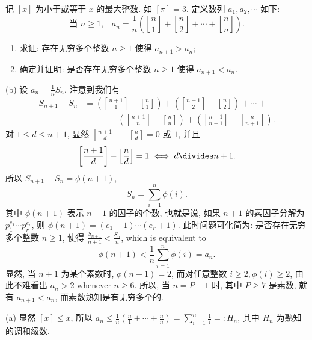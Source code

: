 \begin{prob}
\label{prob:prob-7}
记 $[x]$ 为小于或等于 $x$ 的最大整数. 如 $[\pi] = 3$.
定义数列 $a_1,a_2,\cdots$ 如下:
\[
\text{当 $n \ge 1$,}\quad a_n =
\frac{1}{n}\left(\left[\frac{n}{1}\right] +\left[\frac{n}{2}\right]
+ \cdots + \left[\frac{n}{n}\right]\right).
\]
\begin{enumerate}[label=(\alph*)]
\item 求证: 存在无穷多个整数 $n \ge 1$ 使得 $a_{n+1} > a_n$;
\item 确定并证明: 是否存在无穷多个整数 $n \ge 1$ 使得 $a_{n+1} < a_n$.
\end{enumerate}
\end{prob}

\begin{soln}
(b) 设 $a_n = \frac{1}{n}S_n$. 注意到我们有
\[
\begin{aligned}
S_{n+1} - S_n &= \left(\left[\frac{n+1}{1}\right] - \left[\frac{n}{1}\right]\right)
+ \left(\left[\frac{n+1}{2}\right] - \left[\frac{n}{2}\right]\right) + \cdots + \\
&\phantom{===}\left(\left[\frac{n+1}{n}\right] - \left[\frac{n}{n}\right]\right)
+ \left(\left[\frac{n+1}{n+1}\right] - \left[\frac{n}{n+1}\right]\right).
\end{aligned}
\]
对 $1 \le d \le n+1$, 显然 $[\frac{n+1}{d}] - [\frac{n}{d}] = 0$ 或 $1$, 并且
\[
\left[\frac{n+1}{d}\right] - \left[\frac{n}{d}\right] = 1 \iff d \divides n+1.
\]
所以 $S_{n+1} - S_n = \phi(n+1)$,
\begin{equation}
\label{eq9}
S_n = \sum_{i=1}^n \phi(i).
\end{equation}
其中 $\phi(n+1)$ 表示 $n+1$ 的因子的个数,
也就是说, 如果 $n+1$ 的素因子分解为 $p_1^{e_1}\cdots p_r^{e_r}$,
则 $\phi(n+1) = (e_1+1)\cdots(e_r+1)$.
此时问题可化简为: 是否存在无穷多个整数 $n \ge 1$,
使得 $\frac{S_{n+1}}{n+1} < \frac{S_n}{n}$, which is equivalent to
\begin{equation}
\label{eq10}
\phi(n+1) < \frac{1}{n}\sum_{i=1}^n \phi(i) = a_n.
\end{equation}
显然, 当 $n+1$ 为某个素数时, $\phi(n+1) = 2$,
而对任意整数 $i \ge 2, \phi(i) \ge 2$,
由此不难看出 $a_n > 2$ whenever $n \ge 6$.
所以, 当 $n = P-1$ 时, 其中 $P \ge 7$ 是素数, 就有 $a_{n+1} < a_n$,
而素数熟知是有无穷多个的.

(a) 显然 $[x] \le x$, 所以 $a_n \le \frac{1}{n}(\frac{n}{1} + \cdots + \frac{n}{n})
=\sum_{i=1}^n\frac{1}{i} =: H_n$, 其中 $H_n$ 为熟知的调和级数.


\end{soln}
